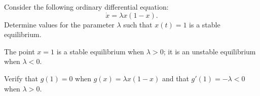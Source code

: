 \documentclass{ximera}
\begin{document}
\begin{computerExercise} \label{c3.3.3}
Consider the following ordinary differential equation:
\[
\dot{x} = \lambda x(1-x).
\]
Determine values for the parameter $\lambda$ such
that $x(t)=1$ is a stable equilibrium.

\begin{solution}

\ans The point $x = 1$ is a stable equilibrium when $\lambda > 0$; it is
an unstable equilibrium when $\lambda < 0$. 

\soln Verify that $g(1) = 0$ when $g(x) = \lambda x(1-x)$ and that $g'(1) = -\lambda<0$ when $\lambda>0$. 

\end{solution}
\end{computerExercise}
\end{document}
